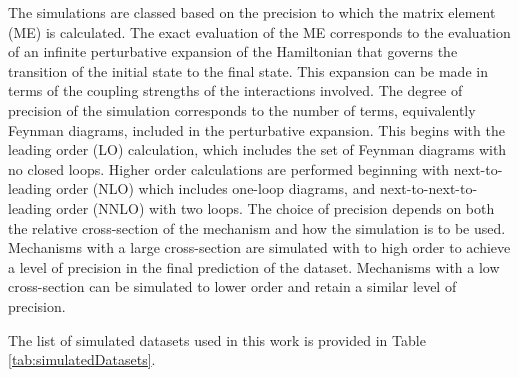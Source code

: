 The simulations are classed based on the precision to which the matrix element (ME) is calculated.
The exact evaluation of the ME corresponds to the evaluation of an infinite perturbative expansion of the Hamiltonian that governs the transition of the initial state to the final state.
This expansion can be made in terms of the coupling strengths of the interactions involved.
The degree of precision of the simulation corresponds to the number of terms, equivalently Feynman diagrams, included in the perturbative expansion.
This begins with the leading order (LO) calculation, which includes the set of Feynman diagrams with no closed loops.
Higher order calculations are performed beginning with next-to-leading order (NLO) which includes one-loop diagrams, and next-to-next-to-leading order (NNLO) with two loops.
The choice of precision depends on both the relative cross-section of the mechanism and how the simulation is to be used.
Mechanisms with a large cross-section are simulated with to high order to achieve a level of precision in the final prediction of the dataset.
Mechanisms with a low cross-section can be simulated to lower order and retain a similar level of precision.

The list of simulated datasets used in this work is provided in Table \ref{tab:simulatedDatasets}.


